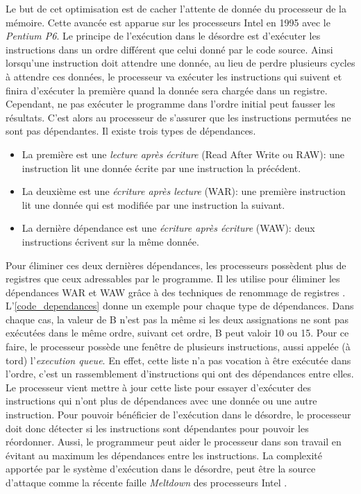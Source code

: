         
            Le but de cet optimisation est de cacher l'attente de donnée du processeur de la mémoire. Cette avancée est apparue sur les processeurs Intel en 1995 avec le \textit{Pentium P6}. Le principe de l'exécution dans le désordre est d'exécuter les instructions dans un ordre différent que celui donné par le code source.  Ainsi lorsqu'une instruction doit attendre une donnée, au lieu de perdre plusieurs cycles à attendre ces données, le processeur va exécuter les instructions qui suivent et finira d'exécuter la première quand la donnée sera chargée dans un registre. 
            Cependant, ne pas exécuter le programme dans l'ordre initial peut fausser les résultats. C'est alors au processeur de s'assurer que les instructions permutées ne sont pas dépendantes. Il existe trois types de dépendances. 
            \begin{itemize}
                \item La première est une \textit{lecture après écriture} (Read After Write ou RAW): une instruction lit une donnée écrite par une instruction la précédent. 
                \item La deuxième est une \textit{écriture après lecture} (WAR): une première instruction lit une donnée qui est modifiée par une instruction la suivant. 
                \item La dernière dépendance est une \textit{écriture après écriture} (WAW): deux instructions écrivent sur la même donnée.  
            \end{itemize}
            Pour éliminer ces deux dernières dépendances, les processeurs possèdent plus de registres que ceux adressables par le programme. Il les utilise pour éliminer les dépendances WAR et WAW grâce à des techniques de renommage de registres \cite{903248}. L'\autoref{code_dependances} donne un exemple pour chaque type de dépendances. Dans chaque cas, la valeur de B n'est pas la même si les deux assignations ne sont pas exécutées dans le même ordre, suivant cet ordre, B peut valoir 10 ou 15. Pour ce faire, le processeur possède une fenêtre de plusieurs instructions, aussi appelée (à tord) l'\textit{execution queue}. En effet, cette liste n'a pas vocation à être exécutée dans l'ordre, c'est un rassemblement d'instructions qui ont des dépendances entre elles. Le processeur vient mettre à jour cette liste pour essayer d'exécuter des instructions qui n'ont plus de dépendances avec une donnée ou une autre instruction.
            Pour pouvoir bénéficier de l'exécution dans le désordre, le processeur doit donc détecter si les instructions sont dépendantes pour pouvoir les réordonner. Aussi, le programmeur peut aider le processeur dans son travail en évitant au maximum les dépendances entre les instructions. 
            La complexité apportée par le système d'exécution dans le désordre, peut être la source d'attaque comme la récente faille \textit{Meltdown} des processeurs Intel \cite{DBLP:journals/corr/abs-1801-01207}.
            
